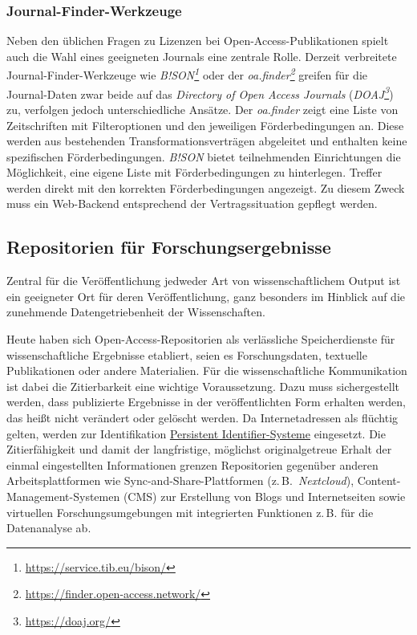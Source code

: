 \documentclass[
  11pt,
  letterpaper,
  DIV=11,
  twoside]{scrreprt}
\DeclareRobustCommand{\href}[2]{#2\footnote{\url{#1}}}
\begin{document}
\subsubsection{Journal-Finder-Werkzeuge}\label{journal-finder-werkzeuge}

Neben den üblichen Fragen zu Lizenzen bei Open-Access-Publikationen
spielt auch die Wahl eines geeigneten Journals eine zentrale Rolle.
Derzeit verbreitete Journal-Finder-Werkzeuge wie
\emph{\href{https://service.tib.eu/bison/}{B!SON}} oder der
\emph{\href{https://finder.open-access.network/}{oa.finder}} greifen für
die Journal-Daten zwar beide auf das \emph{Directory of Open Access
Journals} (\emph{\href{https://doaj.org/}{DOAJ}}) zu, verfolgen jedoch
unterschiedliche Ansätze. Der \emph{oa.finder} zeigt eine Liste von
Zeitschriften mit Filteroptionen und den jeweiligen Förderbedingungen
an. Diese werden aus bestehenden Transformationsverträgen abgeleitet und
enthalten keine spezifischen Förderbedingungen. \emph{B!SON} bietet
teilnehmenden Einrichtungen die Möglichkeit, eine eigene Liste mit
Förderbedingungen zu hinterlegen. Treffer werden direkt mit den
korrekten Förderbedingungen angezeigt. Zu diesem Zweck muss ein
Web-Backend entsprechend der Vertragssituation gepflegt werden.

\subsection{Repositorien für
Forschungsergebnisse}\label{repositorien-fuxfcr-forschungsergebnisse}

Zentral für die Veröffentlichung jedweder Art von wissenschaftlichem
Output ist ein geeigneter Ort für deren Veröffentlichung, ganz besonders
im Hinblick auf die zunehmende Datengetriebenheit der Wissenschaften.

Heute haben sich Open-Access-Repositorien als verlässliche
Speicherdienste für wissenschaftliche Ergebnisse etabliert, seien es
Forschungsdaten, textuelle Publikationen oder andere Materialien. Für
die wissenschaftliche Kommunikation ist dabei die Zitierbarkeit eine
wichtige Voraussetzung. Dazu muss sichergestellt werden, dass
publizierte Ergebnisse in der veröffentlichten Form erhalten werden, das
heißt nicht verändert oder gelöscht werden. Da Internetadressen als
flüchtig gelten, werden zur Identifikation
\hyperref[persistent-identifier]{Persistent Identifier-Systeme}
eingesetzt. Die Zitierfähigkeit und damit der langfristige, möglichst
originalgetreue Erhalt der einmal eingestellten Informationen grenzen
Repositorien gegenüber anderen Arbeitsplattformen wie
Sync-and-Share-Plattformen (z.\,B.~\emph{Nextcloud}),
Content-Management-Systemen (CMS) zur Erstellung von Blogs und
Internetseiten sowie virtuellen Forschungsumgebungen mit integrierten
Funktionen z.\,B. für die Datenanalyse ab.
\end{document}
